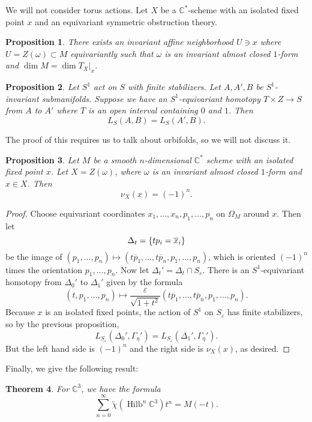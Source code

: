\documentclass[leqno, openany]{memoir}
\newtheorem{thm}{Theorem}[section]
\newtheorem{prop}[thm]{Proposition}
\theoremstyle{definition}
\theoremstyle{remark}
\theoremstyle{plain}
\theoremstyle{definition}
\theoremstyle{remark}
\newcommand{\C}{\mathbb{C}}
\newcommand{\ep}{\varepsilon}
\newcommand{\on}[1]{\operatorname{#1}}
\newcommand{\ol}[1]{\overline{#1}}
\newcommand{\wt}[1]{\widetilde{#1}}
\begin{document}
We will not consider torus actions. Let $X$ be a $\C^*$-scheme with an isolated fixed point $x$ and an equivariant symmetric obstruction theory.

\begin{prop}
    There exists an invariant affine neighborhood $U \ni x$ where $U = Z(\omega) \subset M$ equivariantly such that $\omega$ is an invariant almost closed $1$-form and $\dim M = \dim T_X |_x$.
\end{prop}

\begin{prop}
    Let $S^1$ act on $S$ with finite stabilizers. Let $A, A', B$ be $S^1$-invariant submanifolds. Suppose we have an $S^1$-equivariant homotopy $T \times Z \to S$ from $A$ to $A'$ where $T$ is an open interval containing $0$ and $1$. Then
    \[ L_S(A, B) = L_S(A', B). \]
\end{prop}

The proof of this requires us to talk about orbifolds, so we will not discuss it.

\begin{prop}
    Let $M$ be a smooth $n$-dimensional $\C^*$ scheme with an isolated fixed point $x$. Let $X = Z(\omega)$, where $\omega$ is an invariant almost closed $1$-form and $x \in X$. Then
    \[ \nu_X(x) = (-1)^n. \]
\end{prop}

\begin{proof}
    Choose equivariant coordinates $x_1, \ldots, x_n, p_1, \ldots, p_n$ on $\Omega_M$ around $x$. Then let
    \[ \Delta_t = \qty{t p_i = \ol{x}_i} \]
    be the image of $(p_1, \ldots, p_n) \mapsto (t \ol{p}_1, \ldots, t \ol{p}_n, p_1, \ldots, p_n)$, which is oriented $(-1)^n$ times the orientation $p_1, \ldots, p_n$. Now let $\Delta_t' = \Delta_t \cap S_{\ep}$. There is an $S^1$-equivariant homotopy from $\Delta_0'$ to $\Delta_1'$ given by the formula
    \[ (t, p_1, \ldots, p_n) \mapsto \frac{\ep}{\sqrt{1+t^2}} (t \ol{p}_1, \ldots, t \ol{p}_n, p_1, \ldots, p_n). \]
    Because $x$ is an isolated fixed points, the action of $S^1$ on $S_{\ep}$ has finite stabilizers, so by the previous proposition,
    \[ L_{S_{\ep}}(\Delta_0', \Gamma_{\eta}') = L_{S_{\ep}}(\Delta_1', \Gamma_{\eta}'). \]
    But the left hand side is $(-1)^n$ and the right side is $\nu_X(x)$, as desired.
\end{proof}

Finally, we give the following result:
\begin{thm}
    For $\C^3$, we have the formula
    \[ \sum_{n=0}^{\infty} \wt{\chi}(\on{Hilb}^n \C^3) t^n = M(-t). \]
\end{thm}
\end{document}

